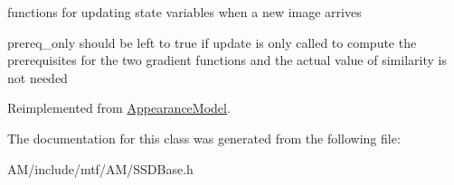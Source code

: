 functions for updating state variables when a new image arrives 

prereq\-\_\-only should be left to true if update is only called to compute the prerequisites for the two gradient functions and the actual value of similarity is not needed 

Reimplemented from \hyperlink{classAppearanceModel_a06136ecd903e85ed2007da2c7b12bd58}{Appearance\-Model}.



The documentation for this class was generated from the following file\-:\begin{DoxyCompactItemize}
\item 
A\-M/include/mtf/\-A\-M/S\-S\-D\-Base.\-h\end{DoxyCompactItemize}
